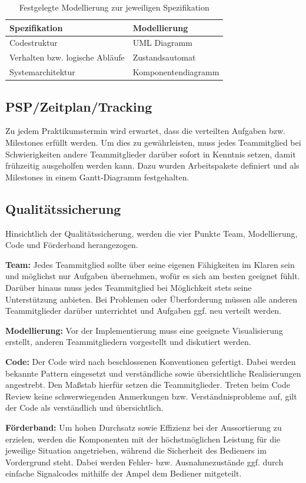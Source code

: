 \documentclass[a4paper, 11pt]{article}
\begin{document}
\begin{table}[h]
\center
\begin{tabularx}{\textwidth}{|l|X|}
\hline
\textbf{Spezifikation}&\textbf{Modellierung}\\
\hline
Codestruktur&UML Diagramm\\
\hline
Verhalten bzw. logische Abläufe&Zustandsautomat\\
\hline
Systemarchitektur&Komponentendiagramm\\
\hline
\end{tabularx}
\caption{Festgelegte Modellierung zur jeweiligen Spezifikation}
\label{visuals}
\end{table}

\subsection{PSP/Zeitplan/Tracking}
Zu jedem Praktikumstermin wird erwartet, dass die verteilten Aufgaben bzw. Milestones erfüllt werden. Um dies zu gewährleisten, muss jedes Teammitglied bei Schwierigkeiten andere Teammitglieder darüber sofort in Kenntnis setzen, damit frühzeitig ausgeholfen werden kann. Dazu wurden Arbeitspakete definiert und als Milestones in einem Gantt-Diagramm festgehalten.
\subsection{Qualitätssicherung}
Hinsichtlich der Qualitätssicherung, werden die vier Punkte Team, Modellierung, Code und Förderband herangezogen.
\medskip
\begin{compactenum}[1.]
\item \textbf{Team:} Jedes Teammitglied sollte über seine eigenen Fähigkeiten im Klaren sein und möglichst nur Aufgaben übernehmen, wofür es sich am besten geeignet fühlt. Darüber hinaus muss jedes Teammitglied bei Möglichkeit stets seine Unterstützung anbieten. Bei Problemen oder Überforderung müssen alle anderen Teammitglieder darüber unterrichtet und Aufgaben ggf. neu verteilt werden.
\medskip
\item \textbf{Modellierung:} Vor der Implementierung muss eine geeignete Visualisierung erstellt, anderen Teammitgliedern vorgestellt und diskutiert werden. 
\medskip
\item \textbf{Code:} Der Code wird nach beschlossenen Konventionen gefertigt. Dabei werden bekannte Pattern eingesetzt und verständliche sowie übersichtliche Realisierungen angestrebt. Den Maßstab hierfür setzen die Teammitglieder. Treten beim Code Review keine schwerwiegenden Anmerkungen bzw. Verständnisprobleme auf, gilt der Code als verständlich und übersichtlich.
\medskip
\item \textbf{Förderband:} Um hohen Durchsatz sowie Effizienz bei der Aussortierung zu erzielen, werden die Komponenten mit der höchstmöglichen Leistung für die jeweilige Situation angetrieben, während die Sicherheit des Bedieners im Vordergrund steht. Dabei werden Fehler- bzw. Ausnahmezustände ggf. durch einfache Signalcodes mithilfe der Ampel dem Bediener mitgeteilt.
\end{compactenum}
\end{document}
